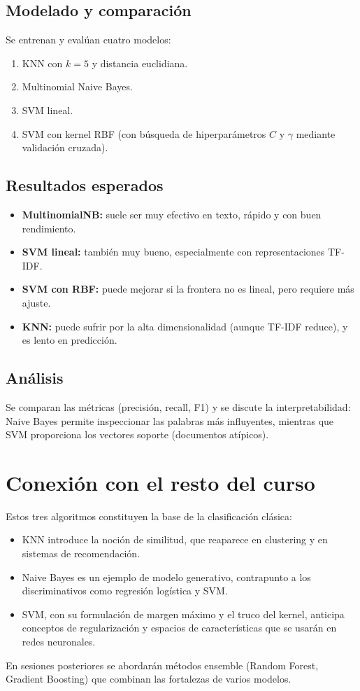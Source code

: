 \documentclass[12pt,a4paper,openany,oneside]{book}
\begin{document}
\subsection{Modelado y comparación}
Se entrenan y evalúan cuatro modelos:
\begin{enumerate}
    \item KNN con \(k=5\) y distancia euclidiana.
    \item Multinomial Naive Bayes.
    \item SVM lineal.
    \item SVM con kernel RBF (con búsqueda de hiperparámetros \(C\) y \(\gamma\) mediante validación cruzada).
\end{enumerate}

\subsection{Resultados esperados}
\begin{itemize}
    \item \textbf{MultinomialNB:} suele ser muy efectivo en texto, rápido y con buen rendimiento.
    \item \textbf{SVM lineal:} también muy bueno, especialmente con representaciones TF-IDF.
    \item \textbf{SVM con RBF:} puede mejorar si la frontera no es lineal, pero requiere más ajuste.
    \item \textbf{KNN:} puede sufrir por la alta dimensionalidad (aunque TF-IDF reduce), y es lento en predicción.
\end{itemize}

\subsection{Análisis}
Se comparan las métricas (precisión, recall, F1) y se discute la interpretabilidad: Naive Bayes permite inspeccionar las palabras más influyentes, mientras que SVM proporciona los vectores soporte (documentos atípicos).

\section{Conexión con el resto del curso}
Estos tres algoritmos constituyen la base de la clasificación clásica:
\begin{itemize}
    \item KNN introduce la noción de similitud, que reaparece en clustering y en sistemas de recomendación.
    \item Naive Bayes es un ejemplo de modelo generativo, contrapunto a los discriminativos como regresión logística y SVM.
    \item SVM, con su formulación de margen máximo y el truco del kernel, anticipa conceptos de regularización y espacios de características que se usarán en redes neuronales.
\end{itemize}
En sesiones posteriores se abordarán métodos ensemble (Random Forest, Gradient Boosting) que combinan las fortalezas de varios modelos.
\end{document}

